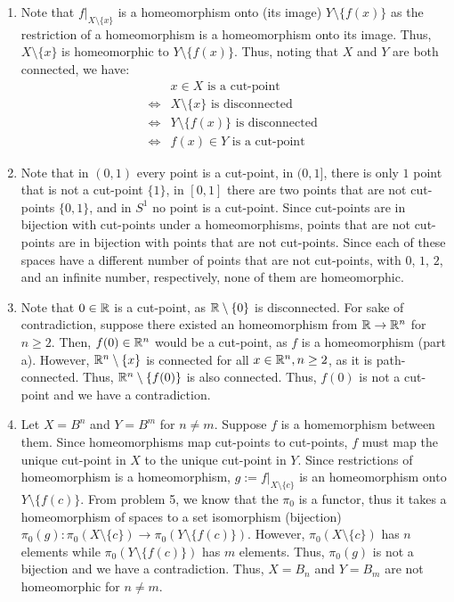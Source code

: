 \documentclass[12pt]{article}
\begin{document}
\begin{solu}
    \bbni
    \begin{enumerate}
        \item Note that $f|_{X\setminus \{x\}}$ is a homeomorphism onto (its image) $Y \setminus \{f(x)\}$ as the restriction of a homeomorphism is a homeomorphism onto its image. Thus, $X \setminus \{x\}$ is homeomorphic to $Y \setminus \{f(x)\}$. Thus, noting that $X$ and $Y$ are both connected, we have:
        \begin{align*}
            &x \in X \text{ is a cut-point } \\
            \iff &X \setminus \{x\} \text{ is disconnected } \\
            \iff &Y \setminus \{f(x)\} \text{ is disconnected } \\
            \iff &f(x) \in Y \text{ is a cut-point} 
        \end{align*}
        \item Note that in $(0, 1)$ every point is a cut-point, in $(0, 1]$, there is only $1$ point that is not a cut-point $\{1\}$, in $[0, 1]$ there are two points that are not cut-points $\{0, 1\}$, and in $S^1$ no point is a cut-point. Since cut-points are in bijection with cut-points under a homeomorphisms, points that are not cut-points are in bijection with points that are not cut-points. Since each of these spaces have a different number of points that are not cut-points, with $0$, $1$, $2$, and an infinite number, respectively, none of them are homeomorphic. 
        \item Note that $0 \in \mathbb R$ is a cut-point, as $\mathbb R \setminus \{0\}$ is disconnected. For sake of contradiction, suppose there existed an homeomorphism from $\mathbb R \to \mathbb R^n$ for $n \geq 2$. Then, $f(0) \in \mathbb R^n$ would be a cut-point, as $f$ is a homeomorphism (part a). However, $\mathbb R^n \setminus \{x\}$ is connected for all $x \in \mathbb R^n, n \geq 2$, as it is path-connected. Thus, $\mathbb R^n \setminus \{f(0)\}$ is also connected. Thus, $f(0)$ is not a cut-point and we have a contradiction.
        \item Let $X = B^n$ and $Y = B^m$ for $n \neq m$. Suppose $f$ is a homemorphism between them. Since homeomorphisms map cut-points to cut-points, $f$ must map the unique cut-point in $X$ to the unique cut-point in $Y$. Since restrictions of homeomorphism is a homeomorphism, $g := f|_{X \setminus \{c\}}$ is an homeomorphism onto $Y \setminus \{f(c)\}$. From problem 5, we know that the $\pi_0$ is a functor, thus it takes a homeomorphism of spaces to a set isomorphism (bijection) $\pi_0(g): \pi_0(X \setminus \{c\}) \to \pi_0(Y \setminus \{f(c)\})$. However, $\pi_0(X \setminus \{c\})$ has $n$ elements while $\pi_0(Y \setminus \{f(c)\})$ has $m$ elements. Thus, $\pi_0(g)$ is not a bijection and we have a contradiction. Thus, $X = B_n$ and $Y = B_m$ are not homeomorphic for $n \neq m$.
    \end{enumerate}
\end{solu}
\newpage
\end{document}
